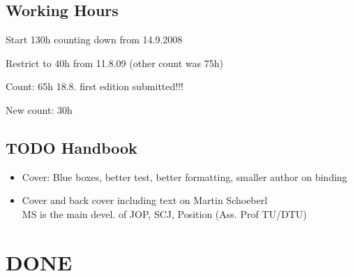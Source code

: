 \section{Working Hours}

Start 130h counting down from 14.9.2008

Restrict to 40h from 11.8.09 (other count was 75h)

Count: 65h 18.8. first edition submitted!!!


New count: 30h


\section{TODO Handbook}

\begin{itemize}
    \item Cover: Blue boxes, better test, better formatting,
        smaller author on binding
    \item Cover and back cover including text on Martin
        Schoeberl\\
        MS is the main devel. of JOP, SCJ, Position (Ass. Prof
    TU/DTU)
\end{itemize}





\chapter{DONE}

